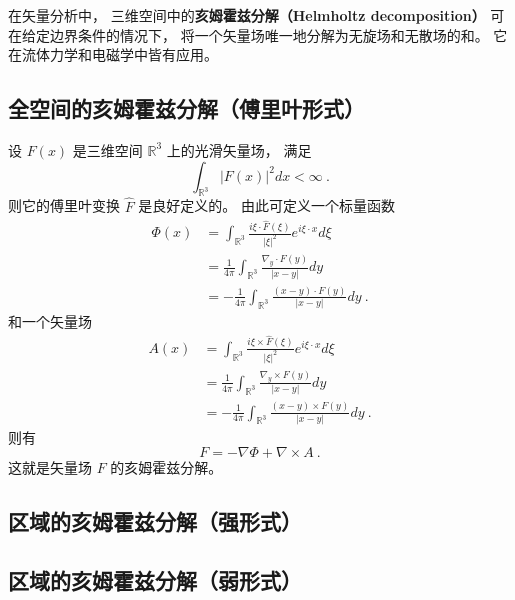 
\begin{issues}
\issueDraft
\end{issues}


在矢量分析中， 三维空间中的\textbf{亥姆霍兹分解（Helmholtz decomposition）} 可在给定边界条件的情况下， 将一个矢量场唯一地分解为无旋场和无散场的和。 它在流体力学和电磁学中皆有应用。

\subsection{全空间的亥姆霍兹分解（傅里叶形式）}
设 $F(x)$ 是三维空间 $\mathbb{R}^3$ 上的光滑矢量场， 满足
$$
\int_{\mathbb{R}^3}|F(x)|^2dx<\infty~.
$$
则它的傅里叶变换 $\hat F$ 是良好定义的。 由此可定义一个标量函数
$$
\begin{aligned}
\Phi(x)
&=\int_{\mathbb{R}^3}\frac{i\xi\cdot\hat F(\xi)}{|\xi|^2}e^{i\xi\cdot x}d\xi\\
&=\frac{1}{4\pi}\int_{\mathbb{R}^3}\frac{\nabla_y\cdot F(y)}{|x-y|}dy\\
&=-\frac{1}{4\pi}\int_{\mathbb{R}^3}\frac{(x-y)\cdot F(y)}{|x-y|}dy~.
\end{aligned}
$$
和一个矢量场
$$
\begin{aligned}
A(x)
&=\int_{\mathbb{R}^3}\frac{i\xi\times\hat F(\xi)}{|\xi|^2}e^{i\xi\cdot x}d\xi\\
&=\frac{1}{4\pi}\int_{\mathbb{R}^3}\frac{\nabla_y\times F(y)}{|x-y|}dy\\
&=-\frac{1}{4\pi}\int_{\mathbb{R}^3}\frac{(x-y)\times F(y)}{|x-y|}dy~.
\end{aligned}
$$
则有
$$
F=-\nabla\Phi+\nabla\times A~.
$$
这就是矢量场 $F$ 的亥姆霍兹分解。

\subsection{区域的亥姆霍兹分解（强形式）}

\subsection{区域的亥姆霍兹分解（弱形式）}
